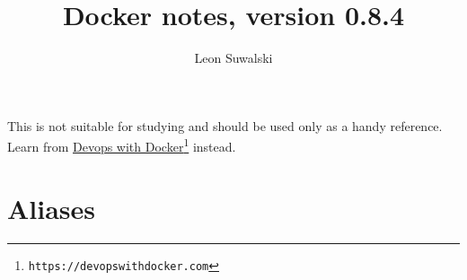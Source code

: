 \documentclass{charun}
\title{Docker notes, version 0.8.4}
\author{Leon Suwalski}
\begin{document}
\begin{multicols}{2}
\maketitle
\raggedright

This is not suitable for studying and should be used only as a handy reference.
Learn from \href{https://devopswithdocker.com}{Devops with Docker}\footnote{\texttt{https://devopswithdocker.com}} instead.










\section{Aliases}


\end{multicols}
\end{document}

